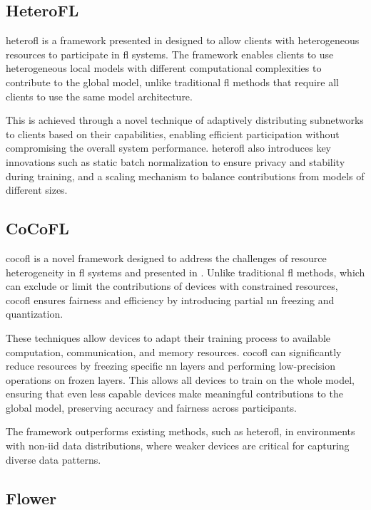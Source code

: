 \subsection{HeteroFL}
\label{sec:heterofl}

\ac{heterofl} is a framework presented in \cite{diao2020heterofl} designed to allow clients with heterogeneous resources to participate in \ac{fl} systems. The framework enables clients to use heterogeneous local models with different computational complexities to contribute to the global model, unlike traditional \ac{fl} methods that require all clients to use the same model architecture. 

This is achieved through a novel technique of adaptively distributing subnetworks to clients based on their capabilities, enabling efficient participation without compromising the overall system performance. \ac{heterofl} also introduces key innovations such as static batch normalization to ensure privacy and stability during training, and a scaling mechanism to balance contributions from models of different sizes.

\subsection{CoCoFL}
\label{sec:cocofl}

\ac{cocofl} is a novel framework designed to address the challenges of resource heterogeneity in \ac{fl} systems and presented in \cite{pfeiffer2022cocofl}. Unlike traditional \ac{fl} methods, which can exclude or limit the contributions of devices with constrained resources, \ac{cocofl} ensures fairness and efficiency by introducing partial \ac{nn} freezing and quantization. 

These techniques allow devices to adapt their training process to available computation, communication, and memory resources. \ac{cocofl} can significantly reduce resources by freezing specific \ac{nn} layers and performing low-precision operations on frozen layers. This allows all devices to train on the whole model, ensuring that even less capable devices make meaningful contributions to the global model, preserving accuracy and fairness across participants. 

The framework outperforms existing methods, such as \ac{heterofl}, in environments with \ac{non-iid} data distributions, where weaker devices are critical for capturing diverse data patterns.

\subsection{Flower}
\label{sec:flower}

